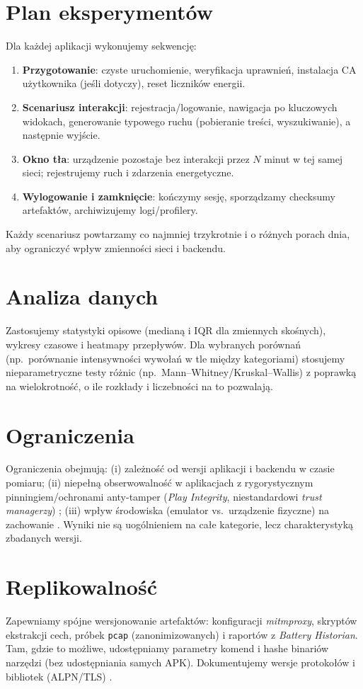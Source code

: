 \section{Plan eksperymentów}
Dla każdej aplikacji wykonujemy sekwencję:
\begin{enumerate}
  \item \textbf{Przygotowanie}: czyste uruchomienie, weryfikacja uprawnień, instalacja CA użytkownika (jeśli dotyczy), reset liczników energii.
  \item \textbf{Scenariusz interakcji}: rejestracja/logowanie, nawigacja po kluczowych widokach, generowanie typowego ruchu (pobieranie treści, wyszukiwanie), a następnie wyjście.
  \item \textbf{Okno tła}: urządzenie pozostaje bez interakcji przez $N$ minut w tej samej sieci; rejestrujemy ruch i zdarzenia energetyczne.
  \item \textbf{Wylogowanie i zamknięcie}: kończymy sesję, sporządzamy checksumy artefaktów, archiwizujemy logi/profilery.
\end{enumerate}
Każdy scenariusz powtarzamy co najmniej trzykrotnie i o różnych porach dnia, aby ograniczyć wpływ zmienności sieci i backendu.

\section{Analiza danych}
Zastosujemy statystyki opisowe (medianą i IQR dla zmiennych skośnych), wykresy czasowe i heatmapy przepływów. Dla wybranych porównań (np.\ porównanie intensywności wywołań w tle między kategoriami) stosujemy nieparametryczne testy różnic (np.\ Mann–Whitney/Kruskal–Wallis) z poprawką na wielokrotność, o ile rozkłady i liczebności na to pozwalają.

\section{Ograniczenia}
Ograniczenia obejmują: (i) zależność od wersji aplikacji i backendu w czasie pomiaru; (ii) niepełną obserwowalność w aplikacjach z rygorystycznym pinningiem/ochronami anty-tamper (\emph{Play Integrity}, niestandardowi \emph{trust managerzy}) \cite{OWASPMASTGPinning}; (iii) wpływ środowiska (emulator vs.\ urządzenie fizyczne) na zachowanie \cite{OWASPMASTGIntercept}. Wyniki nie są uogólnieniem na całe kategorie, lecz charakterystyką zbadanych wersji.

\section{Replikowalność}
Zapewniamy spójne wersjonowanie artefaktów: konfiguracji \textit{mitmproxy}, skryptów ekstrakcji cech, próbek \texttt{pcap} (zanonimizowanych) i raportów z \textit{Battery Historian}. Tam, gdzie to możliwe, udostępniamy parametry komend i hashe binariów narzędzi (bez udostępniania samych APK). Dokumentujemy wersje protokołów i bibliotek (ALPN/TLS) \cite{RFC8446,RFC9114,RFC9000}.


